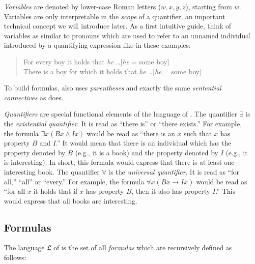 \documentclass[nobib,nofonts]{tufte-handout}
\newcommand{\mygray}[1]{\textcolor{mygray2}{#1}}
\newcommand{\proplog}{\acro{PropLog}}
\newcommand{\predlog}{\acro{PredLog}}
\begin{document}
\emph{Variables} are denoted by lower-case Roman letters ($w, x,y,z$), starting from $w$.
Variables are only interpretable in the \emph{scope} of a quantifier, an important technical concept we will introduce later.
As a first intuitive guide, think of variables as similar to pronouns which are used to refer to an unnamed individual introduced by a quantifying expression like in these examples:

\begin{quote}
For every boy it holds that \emph{he} \dots \hfill \mygray{[\emph{he} = some boy]}\\
There is a boy for which it holds that \emph{he} \dots \hfill \mygray{[\emph{he} = some boy]}\\
\end{quote}

To build formulas, \predlog also uses \emph{parentheses} and exactly the same \emph{sentential connectives} as \proplog does.

\emph{Quantifiers} are special functional elements of the language of \predlog.
The quantifier $\exists$ is the \emph{existential quantifier}.
It is read as ``there is'' or ``there exists.''
For example, the formula $\exists x (Bx \wedge Ix)$ would be read as ``there is an $x$ such that $x$ has property $B$ and $I$.''
It would mean that there is an individual which has the property denoted by $B$ (e.g., it is a book) and the property denoted by $I$ (e.g., it is interesting).
In short, this formula would express that there is at least one interesting book.
The quantifier $\forall$ is the \emph{universal quantifier}.
It is read as ``for all,'' ``all'' or ``every.''
For example, the formula $\forall x (Bx \rightarrow Ix)$ would be read as ``for all $x$ it holds that if $x$ has property $B$, then it also has property $I$.''
This would express that all books are interesting.

\subsection{Formulas}

The language $\mathfrak{L}$ of \predlog is the set of all \emph{formulas} which are recursively defined as follows:
\end{document}
